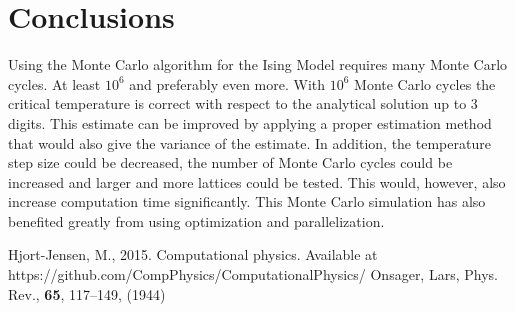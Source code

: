 \documentclass{article}
\begin{document}
\FloatBarrier
\section{Conclusions}
\label{sec:conclusions}
Using the Monte Carlo algorithm for the Ising Model requires many Monte Carlo cycles. At least $10^6$ and preferably even more. With $10^6$ Monte Carlo cycles the critical temperature is correct with respect to the analytical solution up to 3 digits. This estimate can be improved by applying a proper estimation method that would also give the variance of the estimate. In addition, the temperature step size could be decreased, the number of Monte Carlo cycles could be increased and larger and more lattices could be tested. This would, however, also increase computation time significantly. This Monte Carlo simulation has also benefited greatly from using optimization and parallelization. 


\clearpage

\begin{thebibliography}{1}
 Hjort-Jensen, M., 2015. Computational physics. Available at https://github.com/CompPhysics/ComputationalPhysics/
 Onsager, Lars, Phys. Rev., \textbf{65}, 117--149, (1944)
\end{thebibliography}
\end{document}
